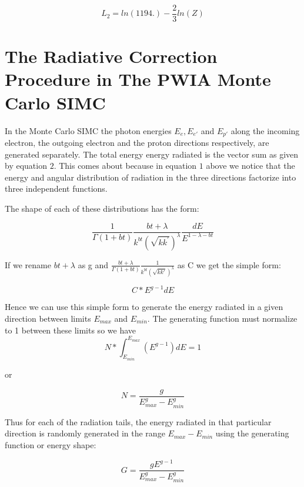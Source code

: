 \begin{equation}
        L_{2} = ln(1194.)  - \frac{2}{3}ln(Z)
\end{equation}



\section*{The Radiative Correction Procedure in The PWIA Monte Carlo SIMC}

In the Monte Carlo SIMC the photon energies $E_{e}, E_{e'}$ and $E_{p'}$ along the incoming electron, the outgoing electron and the proton directions respectively, are generated separately. The total energy energy radiated is the
vector sum as given by equation $2$. This comes about because in 
equation $1$ above we notice that the energy and angular distribution of 
 radiation in the three directions factorize into three independent functions. 

The shape of each of these distributions has the form:

\begin{equation}
\frac{1}{\Gamma(1+bt)}\frac{bt+\lambda}{k^{bt}(\sqrt{kk^{'}})^{\lambda}}\frac{dE}{E^{1-\lambda-bt}}
\end{equation}

If we rename $bt+ \lambda$ as g and $\frac{bt+\lambda}{\Gamma(1+bt)}\frac{1}{k^{bt}(\sqrt{kk'})^{\lambda}} $ as C we get the simple form:

\begin{equation}
 C*E^{g-1}dE
\end{equation}

Hence we can use this simple form to generate the energy radiated in a given direction
between limits $E_{max}$ and $E_{min}$. The generating function must normalize to 1 between these limits so we have 
\begin{equation}
N*\int^{E_{max}}_{E_{min}}(E^{g-1})dE = 1
\end{equation}

or

\begin{equation}
N= \frac{g}{E_{max}^{g} - E_{min}^{g}}
\end{equation}

Thus for each of the radiation tails, the energy radiated in that particular
direction is randomly generated in the range $E_{max} - E_{min}$ using the 
generating function or energy shape:

\begin{equation}
G = \frac{gE^{g-1}}{E_{max}^{g} - E_{min}^{g}}
\end{equation}


